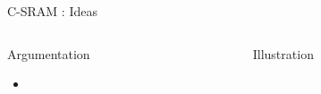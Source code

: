 \begin{Frame}{C-SRAM : Ideas}
 \begin{columns}[t]
   \begin{column}{\BW}
      \begin{block}{Argumentation}
          \begin{itemize}
        \item
      \end{itemize}

    \end{block}

  \end{column}
  \begin{column}{\BW}
      \begin{block}{Illustration}
    \end{block}

  \end{column}

 \end{columns}

\end{Frame}

